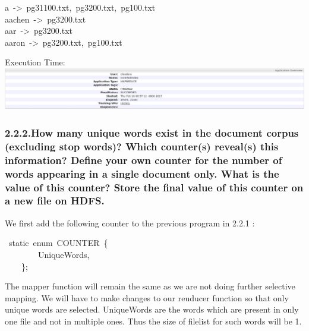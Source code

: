 \documentclass{article}
\begin{document}
\begin{mdpre}%
\noindent a~-\textgreater{}~pg31100.txt,~pg3200.txt,~pg100.txt\\
aachen~-\textgreater{}~pg3200.txt\\
aar~-\textgreater{}~pg3200.txt\\
aaron~-\textgreater{}~pg3200.txt,~pg100.txt%
\end{mdpre}\noindent Execution Time:
\includegraphics[keepaspectratio=true,width=\dimmin{}{\dimwidth{1.30}}]{images/invertedindex}{}

\subsubsection{2.2.2.\hspace*{0.5em}How many unique words exist in the document corpus (excluding stop words)? Which counter(s) reveal(s) this information? Define your own counter for the number of words appearing in a single document only. What is the value of this counter? Store the final value of this counter on a new file on HDFS.}\label{heading}%

\noindent We first add the following counter to the previous program in 2.2.1 :%
\begin{mdpre}%
~{static}~{enum}~COUNTER~\{\\
~~~~~~~~UniqueWords,\\
~~~~\};%
\end{mdpre}\noindent The mapper function will remain the same as we are not doing further selective mapping. We will have to make changes to our reuducer function so that only unique words are selected. 
UniqueWords are the words which are present in only one file and not in multiple ones. Thus the size of filelist for such words will be 1.
\end{document}
